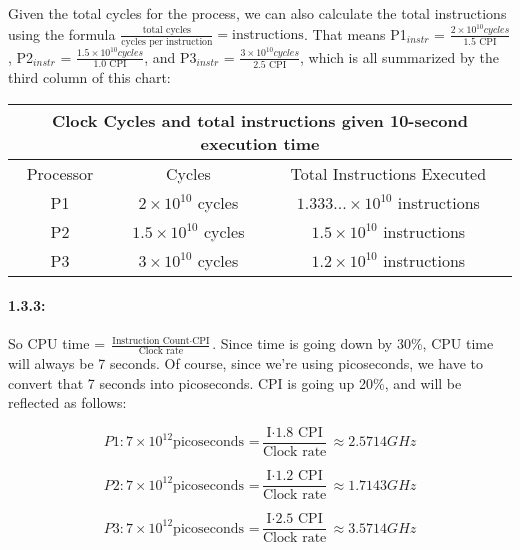 \documentclass[a4paper]{article}
\begin{document}
Given the total cycles for the process, we can also calculate the total instructions using the formula $\frac{\mbox{total cycles}}{\mbox{cycles per instruction}} = \mbox{instructions}$. That means P1$_{instr}$ = $\frac{2\times10^{10} cycles}{\mbox{1.5 CPI}}$, P2$_{instr}$ = $\frac{1.5\times10^{10} cycles}{\mbox{1.0 CPI}}$, and P3$_{instr}$ = $\frac{3\times10^{10} cycles}{\mbox{2.5 CPI}}$, which is all summarized by the third column of this chart:
\begin{center}
\begin{tabular}{|c|c|c|c|c|}
\hline
\multicolumn{5}{|c|}{Clock Cycles and total instructions given 10-second execution time}\\
\hline
\hline
Processor & \multicolumn{2}{|c|}{Cycles} & \multicolumn{2}{|c|}{Total Instructions Executed}\\
\hline
P1 & \multicolumn{2}{|c|}{$2\times10^{10}$ cycles} & \multicolumn{2}{|c|}{$1.333...\times10^{10}$ instructions}\\
\hline
P2 & \multicolumn{2}{|c|}{$1.5\times10^{10}$ cycles} & \multicolumn{2}{|c|}{$1.5\times10^{10}$ instructions}\\
\hline
P3 & \multicolumn{2}{|c|}{$3\times10^{10}$ cycles} & \multicolumn{2}{|c|}{$1.2\times10^{10}$ instructions}\\
\hline
\end{tabular}
\end{center}

\paragraph*{1.3.3:} So CPU time = $\frac{\mbox{Instruction Count} \cdot \mbox{CPI}}{\mbox{Clock rate}}$. Since time is going down by 30\%, CPU time will always be 7 seconds. Of course, since we're using picoseconds, we have to convert that 7 seconds into picoseconds. CPI is going up 20\%, and will be reflected as follows:

\begin{equation}
P1: \mbox{7}\times 10^{12} \mbox{picoseconds =} \frac{\mbox{I} \cdot \mbox{1.8 CPI}}{\mbox{Clock rate}} \approx 2.5714 GHz
\end{equation}

\begin{equation}
P2: \mbox{7}\times 10^{12} \mbox{picoseconds =} \frac{\mbox{I} \cdot \mbox{1.2 CPI}}{\mbox{Clock rate}} \approx 1.7143 GHz
\end{equation}

\begin{equation}
P3: \mbox{7}\times 10^{12} \mbox{picoseconds =} \frac{\mbox{I} \cdot \mbox{2.5 CPI}}{\mbox{Clock rate}} \approx 3.5714 GHz
\end{equation}
\end{document}
